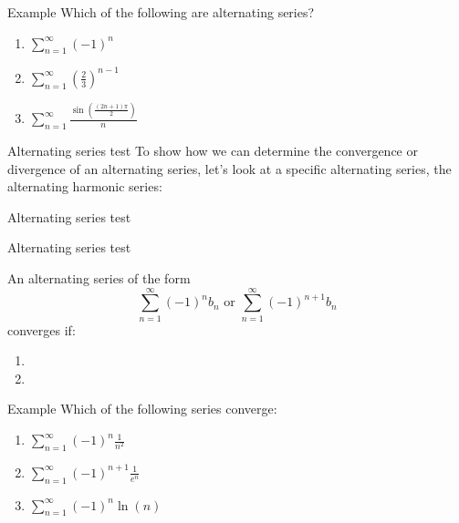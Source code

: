 \documentclass[presentation]{beamer}
\begin{document}
\begin{frame}[label={sec:org9fbb0c7}]{Example}
Which of the following are alternating series?
\begin{enumerate}
\item \(\sum\limits_{n=1}^{\infty} \left( -1 \right)^n\)
\item \(\sum\limits_{n=1}^{\infty} \left( \frac{2}{3} \right)^{n-1}\)
\item \(\sum\limits_{n=1}^{\infty} \frac{\sin \left( \frac{(2n+1)\pi}{2} \right)}{n}\)
\vspace{10in}
\end{enumerate}
\end{frame}
\begin{frame}[label={sec:orgd2f90ed}]{Alternating series test}
To show how we can determine the convergence or divergence of an
alternating series, let's look at a specific alternating series, the
\alert{alternating harmonic series}:
\vspace{10in}
\end{frame}
\begin{frame}[label={sec:org604452a}]{Alternating series test}
\end{frame}
\begin{frame}[label={sec:org8f2f4f5}]{Alternating series test}
\begin{theorem}
An alternating series of the form
\[
\sum\limits_{n=1}^{\infty} \left( -1 \right)^n b_n \text{ or } \sum\limits_{n=1}^{\infty} \left( -1 \right)^{n+1}b_n\]
converges if:
\begin{enumerate}
\item 

\item 
\end{enumerate}
\end{theorem}
\end{frame}

\begin{frame}[label={sec:org4418213}]{Example}
Which of the following series converge:
\begin{enumerate}
\item \(\sum\limits_{n=1}^{\infty} \left( -1 \right)^n \frac{1}{n^2}\)
\item \(\sum\limits_{n=1}^{\infty} \left( -1 \right)^{n+1} \frac{1}{e^n}\)
\item \(\sum\limits_{n=1}^{\infty} \left( -1 \right)^n \ln(n)\)
\vspace{10in}
\end{enumerate}
\end{frame}
\end{document}
